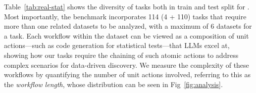 Table~\ref{tab:real-stat} shows the diversity of tasks both in train and test split for \real{}. Most importantly, the benchmark incorporates 114 (4 + 110) tasks that require more than one related datasets
to be analyzed, with a maximum of 6 datasets 
for a task. Each workflow within the dataset can be viewed as a composition of unit actions---such as code generation for statistical tests---that LLMs excel at, showing how our tasks require the chaining of such atomic actions to address complex scenarios for data-driven discovery. We measure the complexity of these workflows by quantifying the number of unit actions involved, referring to this as the \emph{workflow length}, whose distribution can be seen in Fig~\ref{fig:analysis}.












